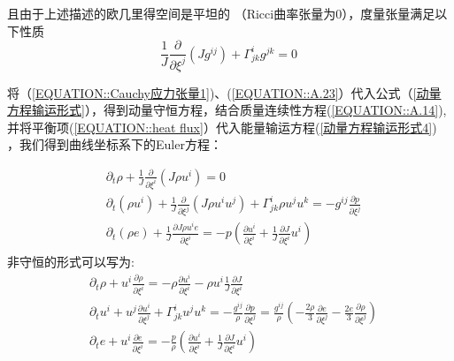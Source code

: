 \documentclass[MathematicsNumericsDerivationsAndOpenFOAM.tex]{subfiles}
\begin{document}
%
%

且由于上述描述的欧几里得空间是平坦的 （Ricci曲率张量为0），度量张量满足以下性质
\begin{equation}
  \frac{1}{J} \frac{\partial}{\partial \xi^{j}}\left(J g^{i j}\right)+\Gamma_{j k}^{i} g^{j k}=0
  \label{EQUATION::A.23} ~
\end{equation}
%
%

将（\ref{EQUATION::Cauchy应力张量1})、(\ref{EQUATION::A.23}）代入公式（\ref{动量方程输运形式}），得到动量守恒方程，结合质量连续性方程(\ref{EQUATION::A.14}), 并将平衡项(\ref{EQUATION::heat flux}）代入能量输运方程(\ref{动量方程输运形式4})
，我们得到曲线坐标系下的Euler方程：



\begin{equation}
  \boxed{
    \begin{aligned}
       & \partial_{t} \rho+\frac{1}{J} \frac{\partial}{\partial \xi^{i}}\left(J \rho u^{i}\right)=0
      \\
       & \partial_{t}\left(\rho u^{i}\right)+\frac{1}{J} \frac{\partial}{\partial \xi^{j}}\left(J \rho u^{i} u^{j}\right)+\Gamma_{j k}^{i} \rho u^{j} u^{k}=-g^{i j} \frac{\partial p}{\partial \xi^{j}}   \\
       & \partial_{t}\left(\rho e\right) + \frac{1}{J}\frac{\partial J \rho u^i e}{\partial  \xi^{i}}  = -  p (\frac{\partial  u^i}{\partial \xi^{i}}  + \frac{1}{J} \frac{\partial J}{\partial \xi^i}u^i) \\
    \end{aligned}
  }
  \label{EQUATION::Eluer} ~
\end{equation}
%
%
非守恒的形式可以写为:
\begin{equation}
  \begin{aligned}
     & \partial_{t} \rho+ u^i \frac{\partial \rho}{\partial \xi^i}=-\rho \frac{\partial u^i}{\partial \xi^i}-\rho u^i \frac{1}{J} \frac{\partial J}{\partial \xi^i}
    \\
     & \partial_{t}u^{i}+u^j \frac{\partial u^i}{\partial \xi^{j}}+\Gamma_{j k}^{i}  u^{j} u^{k}=-\frac{g^{i j}}{\rho} \frac{\partial p}{\partial \xi^{j}}= \frac{g^{i j}}{\rho} (-\frac{2\rho}{3}\frac{\partial e}{\partial \xi^j} - \frac{2e}{3}\frac{\partial \rho}{\partial \xi^j}) \\
     & \partial_{t}e + u^i\frac{\partial e}{\partial  \xi^{i}}  = -  \frac{p}{\rho} (\frac{\partial  u^i}{\partial \xi^{i}}  + \frac{1}{J} \frac{\partial J}{\partial \xi^i}u^i)                                                                                                        \\
  \end{aligned}
  \label{EQUATION::Eluer非守恒} ~
\end{equation}
\end{document}
